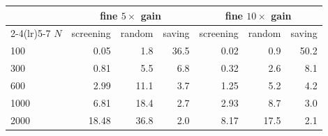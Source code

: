 \begin{tabular}{lrrrrrr}
\toprule
& \multicolumn{3}{c}{fine $5\times$ gain} & \multicolumn{3}{c}{fine $10\times$ gain} \\
\cmidrule(lr){2-4}\cmidrule(lr){5-7}
$N$ & screening & random & saving & screening & random & saving \\
\midrule
100 & 0.05 & 1.8 & 36.5 & 0.02 & 0.9 & 50.2 \\
300 & 0.81 & 5.5 & 6.8 & 0.32 & 2.6 & 8.1 \\
600 & 2.99 & 11.1 & 3.7 & 1.25 & 5.2 & 4.2 \\
1000 & 6.81 & 18.4 & 2.7 & 2.93 & 8.7 & 3.0 \\
2000 & 18.48 & 36.8 & 2.0 & 8.17 & 17.5 & 2.1 \\
\bottomrule
\end{tabular}
